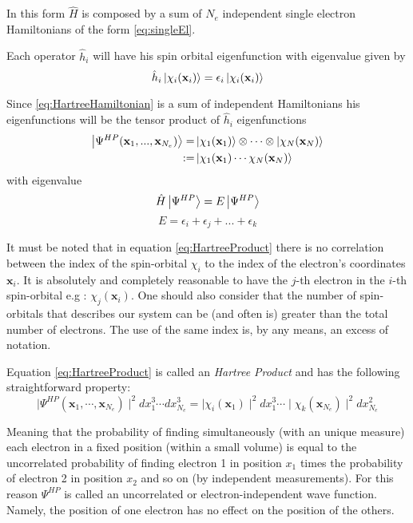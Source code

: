 \documentclass[a4paper,12pt]{article}
\begin{document}
In this form $\hat{H}$ is composed by a sum of $N_e$ independent single electron Hamiltonians of the form \eqref{eq:singleEl}.

Each operator $\hat{h}_i$ will have his spin orbital eigenfunction with eigenvalue given by
\begin{equation}
	\hat{h}_{i} \ket{\chi_{i}(\mathbf{x}_i) } = \epsilon_{i} \ket{\chi_{i}(\mathbf{x}_i) }
\end{equation}

Since \eqref{eq:HartreeHamiltonian} is a sum of independent Hamiltonians his eigenfunctions will be the tensor product of $\hat{h}_i$ eigenfunctions
\begin{align}\label{eq:HartreeProduct}
	\ket{\Psi^{HP}(\mathbf{x}_{1},...,\mathbf{x}_{N_e})} = & \ket{\chi_1(\mathbf{x}_{1})} \otimes \cdots  \otimes \ket{\chi_N(\mathbf{x}_{N})} \\
	:= & \ket{ \chi_{1}(\mathbf{x}_{1}) \cdots \chi_{N}(\mathbf{x}_{N}) }
\end{align}
with eigenvalue
\begin{equation}
	\hat{H}\ket{\Psi^{HP}} = E\ket{\Psi^{HP}}
\end{equation}
\begin{equation}
	E = \epsilon_i + \epsilon_j + ... + \epsilon_k
\end{equation}

It must be noted that in equation \eqref{eq:HartreeProduct} there is no correlation between the index of the spin-orbital $\chi_{i}$ to the index of the electron's coordinates $\mathbf{x}_i$. It is absolutely and completely reasonable to have the $j$-th electron in the $i$-th spin-orbital e.g : $\chi_{j}(\mathbf{x}_{i})$.
One should also consider that the number of spin-orbitals that describes our system can be (and often is) greater than the total number of electrons. The use of the same index is, by any means, an excess of notation.


Equation \eqref{eq:HartreeProduct} is called an \textit{Hartree Product} and has the following straightforward property: 
\begin{equation}\label{eq:uncorrelated}
	\mid\Psi^{HP}(\mathbf{x}_1,\cdots,\mathbf{x}_{N_e}) \mid^2 dx_1^3 \cdots dx_{N_e}^3 = \mid\chi_i(\mathbf{x}_1)\mid^2 dx_1^3 \cdots \mid \chi_k(\mathbf{x}_{N_e})\mid^2 dx_{N_e}^2
\end{equation}

Meaning that the probability of finding simultaneously (with an unique measure) each electron in a fixed position (within a small volume) is equal to the uncorrelated probability of finding electron 1 in position $x_1$ times the probability of electron 2 in position $x_2$ and so on (by independent measurements).
For this reason $\Psi^{HP}$ is called an uncorrelated or electron-independent wave function. 
Namely, the position of one electron has no effect on the position of the others. 
\end{document}
